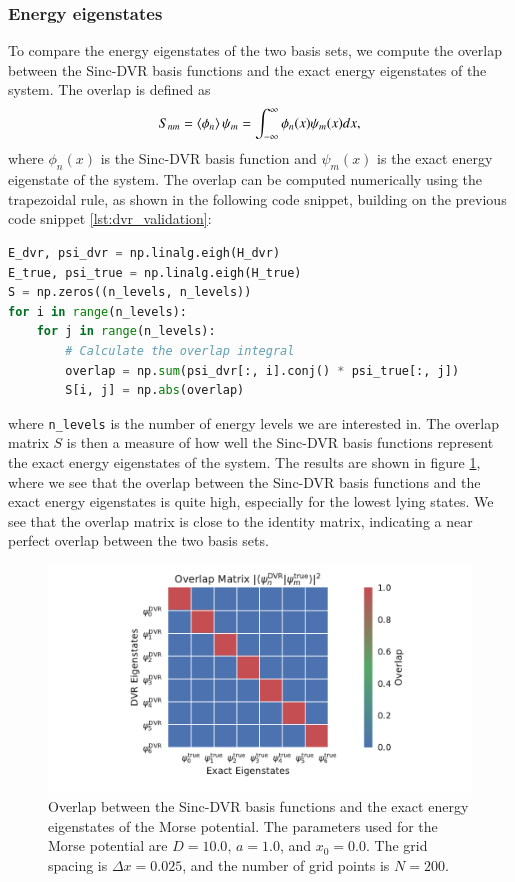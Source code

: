 \documentclass{subfiles}
\begin{document}
\subsubsection*{Energy eigenstates}
To compare the energy eigenstates of the two basis sets, we compute the overlap between the Sinc-DVR basis functions and the exact energy eigenstates of the system. The overlap is defined as
\begin{align*}
    S_{nm} = \braket{\phi_n}{\psi_m} = \int_{-\infty}^{\infty} \phi_n(x) \psi_m(x) dx,
\end{align*}
where $\phi_n(x)$ is the Sinc-DVR basis function and $\psi_m(x)$ is the exact energy eigenstate of the system. The overlap can be computed numerically using the trapezoidal rule, as shown in the following code snippet, building on the previous code snippet \ref{lst:dvr_validation}:
\begin{lstlisting}[language=Python]
E_dvr, psi_dvr = np.linalg.eigh(H_dvr)
E_true, psi_true = np.linalg.eigh(H_true)
S = np.zeros((n_levels, n_levels))
for i in range(n_levels):
    for j in range(n_levels):
        # Calculate the overlap integral
        overlap = np.sum(psi_dvr[:, i].conj() * psi_true[:, j])
        S[i, j] = np.abs(overlap)
\end{lstlisting}
where \texttt{n\_levels} is the number of energy levels we are interested in. The overlap matrix $S$ is then a measure of how well the Sinc-DVR basis functions represent the exact energy eigenstates of the system. The results are shown in figure \ref{fig:dvr_validation_overlap}, where we see that the overlap between the Sinc-DVR basis functions and the exact energy eigenstates is quite high, especially for the lowest lying states. We see that the overlap matrix is close to the identity matrix, indicating a near perfect overlap between the two basis sets.
\begin{figure}[h!]
    \centering
    \includegraphics[width=\textwidth]{figs/dvr_validation_overlap.pdf}
    \caption{Overlap between the Sinc-DVR basis functions and the exact energy eigenstates of the Morse potential. The parameters used for the Morse potential are $D = 10.0$, $a = 1.0$, and $x_0 = 0.0$. The grid spacing is $\Delta x = 0.025$, and the number of grid points is $N = 200$.}
    \label{fig:dvr_validation_overlap}
\end{figure}
\\ \\ 
\end{document}
